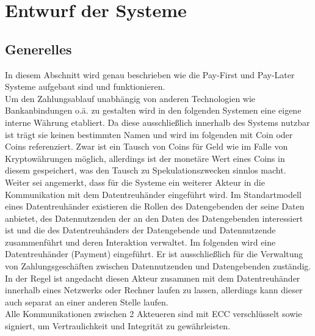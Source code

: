 \documentclass[11pt,a4paper]{scrreprt}
\begin{document}





\chapter{Entwurf der Systeme}
\section{Generelles}
% 
In diesem Abschnitt wird genau beschrieben wie die Pay-First und Pay-Later Systeme aufgebaut sind und funktionieren. \\
Um den Zahlungsablauf unabhängig von anderen Technologien wie Bankanbindungen o.ä. zu gestalten wird in den folgenden Systemen eine eigene interne Währung etabliert. Da diese ausschließlich innerhalb des Systems nutzbar ist trägt sie keinen bestimmten Namen und wird im folgenden mit Coin oder Coins referenziert. Zwar ist ein Tausch von Coins für Geld wie im Falle von Kryptowährungen möglich, allerdings ist der monetäre Wert eines Coins in diesem gespeichert, was den Tausch zu Spekulationszwecken sinnlos macht.\\
Weiter sei angemerkt, dass für die Systeme ein weiterer Akteur in die Kommunikation mit dem Datentreuhänder eingeführt wird. Im Standartmodell eines Datentreuhänder existieren die Rollen des Datengebenden der seine Daten anbietet, des Datennutzenden der an den Daten des Datengebenden interessiert ist und die des Datentreuhänders der Datengebende und Datennutzende zusammenführt und deren Interaktion verwaltet. Im folgenden wird eine Datentreuhänder (Payment) eingeführt. Er ist ausschließlich für die Verwaltung von Zahlungsgeschäften zwischen Datennutzenden und Datengebenden zuständig. In der Regel ist angedacht diesen Akteur zusammen mit dem Datentreuhänder innerhalb eines Netzwerks oder Rechner laufen zu lassen, allerdings kann dieser auch separat an einer anderen Stelle laufen.\\
Alle Kommunikationen zwischen 2 Akteueren sind mit ECC verschlüsselt sowie signiert, um Vertraulichkeit und Integrität zu gewährleisten.
\end{document}
